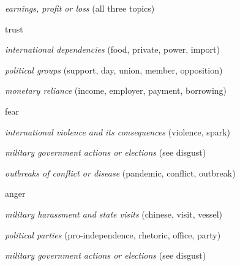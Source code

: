 \begin{aenumerate}
	\begin{aenumerate}
		\item \textit{earnings, profit or loss} (all three topics)
	\end{aenumerate}
	\item trust
	\begin{aenumerate}
		\item \textit{international dependencies} (food, private, power, import)
		\item \textit{political groups} (support, day, union, member, opposition)
		\item \textit{monetary reliance} (income, employer, payment, borrowing)
	\end{aenumerate}
	\item fear
	\begin{aenumerate}
		\item \textit{international violence and its consequences} (violence, spark)
		\item \textit{military government actions or elections} (see disgust)
		\item \textit{outbreaks of conflict or disease} (pandemic, conflict, outbreak)
	\end{aenumerate}
	\item anger
	\begin{aenumerate}
		\item \textit{military harassment and state visits} (chinese, visit, vessel)
		\item \textit{political parties} (pro-independence, rhetoric, office, party)
		\item \textit{military government actions or elections} (see disgust)
	\end{aenumerate}
\end{aenumerate}